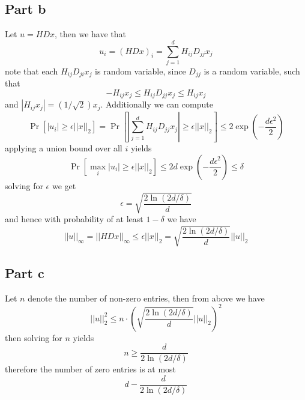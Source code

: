 \documentclass[12pt]{report}
\newcommand{\norm}[1]{\left|\left|#1\right|\right|}
\begin{document}
\subsection*{Part b}
Let $u = HDx$, then we have that
\begin{equation*}
    u_i = (HDx)_i = \sum_{j=1}^d H_{ij}D_{jj} x_j
\end{equation*}
note that each $H_{ij}D_{ji}x_j$ is random variable, since $D_{jj}$ is a random variable, such that
\begin{equation*}
    -H_{ij}x_j \leq H_{ij}D_{jj}x_j \leq H_{ij}x_j
\end{equation*}
and $|H_{ij}x_j| = (1/\sqrt{2})x_j$. Additionally we can compute
\begin{equation*}
    \Pr[|u_i| \geq \epsilon \norm{x}_2] = \Pr\left[\left|\sum_{j=1}^d H_{ij}D_{jj} x_j\right| \geq \epsilon \norm{x}_2\right] \leq 2\exp\left(-\frac{d\epsilon^2}{2}\right)
\end{equation*}
applying a union bound over all $i$ yields
\begin{equation*}
    \Pr[\max_i |u_i| \geq \epsilon \norm{x}_2] \leq 2d\exp\left(-\frac{d\epsilon^2}{2}\right) \leq \delta 
\end{equation*}
solving for $\epsilon$ we get
\begin{equation*}
    \epsilon = \sqrt{\frac{2 \ln(2d/\delta)}{d}}
\end{equation*}
and hence with probability of at least $1-\delta$ we have
\begin{equation*}
    \norm{u}_\infty = \norm{HDx}_\infty \leq \epsilon \norm{x}_2 = \sqrt{\frac{2 \ln(2d/\delta)}{d}} \norm{u}_2
\end{equation*}

\subsection*{Part c}
Let $n$ denote the number of non-zero entries, then from above we have
\begin{equation*}
    \norm{u}_2^2 \leq n \cdot \left( \sqrt{\frac{2 \ln(2d/\delta)}{d}} \norm{u}_2\right)^2
\end{equation*}
then solving for $n$ yields
\begin{equation*}
    n \geq \frac{d}{2\ln(2d/\delta)}
\end{equation*}
therefore the number of zero entries is at most
\begin{equation*}
    d -  \frac{d}{2\ln(2d/\delta)}
\end{equation*}
\end{document}
